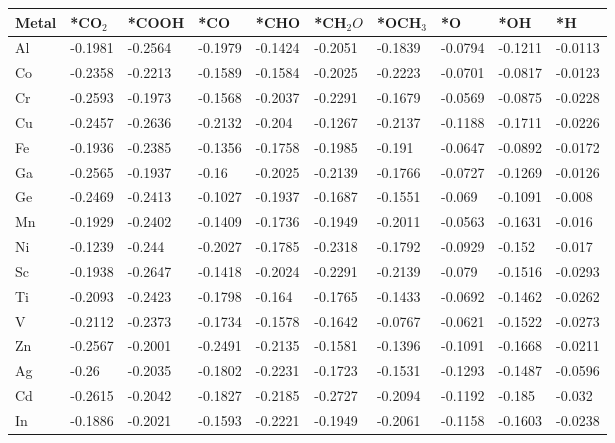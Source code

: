 \begin{table}[h]
  \centering
  {\fontsize{6}{12}\selectfont
  \begin{tabular}{*{10}{l}}
      \hline
      Metal & *CO$_2$ & *COOH& *CO     & *CHO    & *CH$_2O$& *OCH$_3$& *O      & *OH     & *H      \\
      \hline
      Al & -0.1981 & -0.2564 & -0.1979 & -0.1424 & -0.2051 & -0.1839 & -0.0794 & -0.1211 & -0.0113 \\
      Co & -0.2358 & -0.2213 & -0.1589 & -0.1584 & -0.2025 & -0.2223 & -0.0701 & -0.0817 & -0.0123 \\
      Cr & -0.2593 & -0.1973 & -0.1568 & -0.2037 & -0.2291 & -0.1679 & -0.0569 & -0.0875 & -0.0228 \\
      Cu & -0.2457 & -0.2636 & -0.2132 & -0.204  & -0.1267 & -0.2137 & -0.1188 & -0.1711 & -0.0226 \\
      Fe & -0.1936 & -0.2385 & -0.1356 & -0.1758 & -0.1985 & -0.191  & -0.0647 & -0.0892 & -0.0172 \\
      Ga & -0.2565 & -0.1937 & -0.16   & -0.2025 & -0.2139 & -0.1766 & -0.0727 & -0.1269 & -0.0126 \\
      Ge & -0.2469 & -0.2413 & -0.1027 & -0.1937 & -0.1687 & -0.1551 & -0.069  & -0.1091 & -0.008  \\
      Mn & -0.1929 & -0.2402 & -0.1409 & -0.1736 & -0.1949 & -0.2011 & -0.0563 & -0.1631 & -0.016  \\
      Ni & -0.1239 & -0.244  & -0.2027 & -0.1785 & -0.2318 & -0.1792 & -0.0929 & -0.152  & -0.017  \\
      Sc & -0.1938 & -0.2647 & -0.1418 & -0.2024 & -0.2291 & -0.2139 & -0.079  & -0.1516 & -0.0293 \\
      Ti & -0.2093 & -0.2423 & -0.1798 & -0.164  & -0.1765 & -0.1433 & -0.0692 & -0.1462 & -0.0262 \\
      V  & -0.2112 & -0.2373 & -0.1734 & -0.1578 & -0.1642 & -0.0767 & -0.0621 & -0.1522 & -0.0273 \\
      Zn & -0.2567 & -0.2001 & -0.2491 & -0.2135 & -0.1581 & -0.1396 & -0.1091 & -0.1668 & -0.0211 \\
      Ag & -0.26   & -0.2035 & -0.1802 & -0.2231 & -0.1723 & -0.1531 & -0.1293 & -0.1487 & -0.0596 \\
      Cd & -0.2615 & -0.2042 & -0.1827 & -0.2185 & -0.2727 & -0.2094 & -0.1192 & -0.185  & -0.032  \\
      In & -0.1886 & -0.2021 & -0.1593 & -0.2221 & -0.1949 & -0.2061 & -0.1158 & -0.1603 & -0.0238 \\

\end{tabular}}
\end{table}
